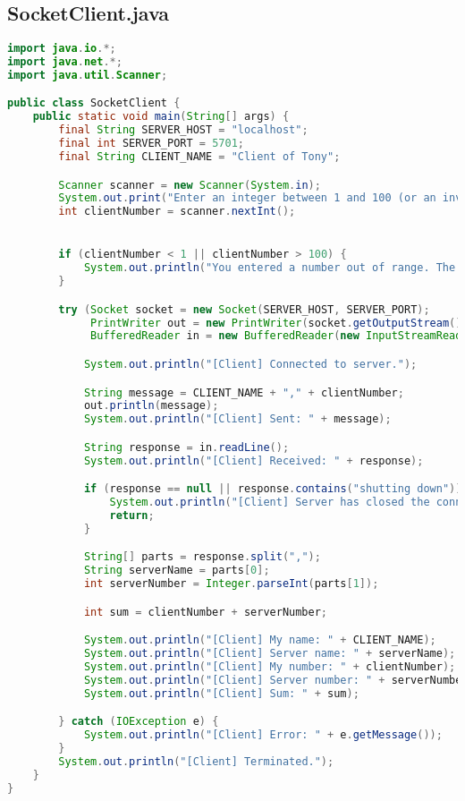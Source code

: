 \documentclass{article}
\begin{document}
\subsection{SocketClient.java}
\begin{lstlisting}[language=Java, caption={SocketClient.java - Client Application}]
import java.io.*;
import java.net.*;
import java.util.Scanner;

public class SocketClient {
    public static void main(String[] args) {
        final String SERVER_HOST = "localhost";
        final int SERVER_PORT = 5701;
        final String CLIENT_NAME = "Client of Tony";

        Scanner scanner = new Scanner(System.in);
        System.out.print("Enter an integer between 1 and 100 (or an invalid number to shut down the server): ");
        int clientNumber = scanner.nextInt();


        if (clientNumber < 1 || clientNumber > 100) {
            System.out.println("You entered a number out of range. The server should shut down.");
        }

        try (Socket socket = new Socket(SERVER_HOST, SERVER_PORT);
             PrintWriter out = new PrintWriter(socket.getOutputStream(), true);
             BufferedReader in = new BufferedReader(new InputStreamReader(socket.getInputStream()))) {

            System.out.println("[Client] Connected to server.");

            String message = CLIENT_NAME + "," + clientNumber;
            out.println(message);
            System.out.println("[Client] Sent: " + message);

            String response = in.readLine();
            System.out.println("[Client] Received: " + response);

            if (response == null || response.contains("shutting down")) {
                System.out.println("[Client] Server has closed the connection.");
                return;
            }

            String[] parts = response.split(",");
            String serverName = parts[0];
            int serverNumber = Integer.parseInt(parts[1]);

            int sum = clientNumber + serverNumber;

            System.out.println("[Client] My name: " + CLIENT_NAME);
            System.out.println("[Client] Server name: " + serverName);
            System.out.println("[Client] My number: " + clientNumber);
            System.out.println("[Client] Server number: " + serverNumber);
            System.out.println("[Client] Sum: " + sum);

        } catch (IOException e) {
            System.out.println("[Client] Error: " + e.getMessage());
        }
        System.out.println("[Client] Terminated.");
    }
}
\end{lstlisting}
\end{document}
